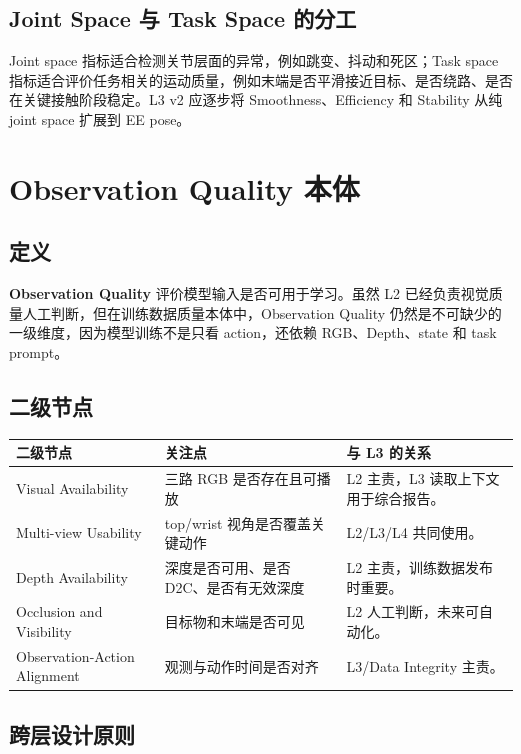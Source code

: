 \documentclass[UTF8,zihao=-4,oneside,openany]{ctexrep}
\newcommand{\Term}[1]{\textbf{#1}}
\begin{document}
\subsection{Joint Space 与 Task Space 的分工}

Joint space 指标适合检测关节层面的异常，例如跳变、抖动和死区；Task space 指标适合评价任务相关的运动质量，例如末端是否平滑接近目标、是否绕路、是否在关键接触阶段稳定。L3 v2 应逐步将 Smoothness、Efficiency 和 Stability 从纯 joint space 扩展到 EE pose。

\section{Observation Quality 本体}

\subsection{定义}

\Term{Observation Quality} 评价模型输入是否可用于学习。虽然 L2 已经负责视觉质量人工判断，但在训练数据质量本体中，Observation Quality 仍然是不可缺少的一级维度，因为模型训练不是只看 action，还依赖 RGB、Depth、state 和 task prompt。

\subsection{二级节点}

\begin{longtable}{L{3.2cm} L{5cm} L{5.5cm}}
\toprule
二级节点 & 关注点 & 与 L3 的关系 \\
\midrule
Visual Availability & 三路 RGB 是否存在且可播放 & L2 主责，L3 读取上下文用于综合报告。 \\
Multi-view Usability & top/wrist 视角是否覆盖关键动作 & L2/L3/L4 共同使用。 \\
Depth Availability & 深度是否可用、是否 D2C、是否有无效深度 & L2 主责，训练数据发布时重要。 \\
Occlusion and Visibility & 目标物和末端是否可见 & L2 人工判断，未来可自动化。 \\
Observation-Action Alignment & 观测与动作时间是否对齐 & L3/Data Integrity 主责。 \\
\bottomrule
\end{longtable}

\subsection{跨层设计原则}
\end{document}
